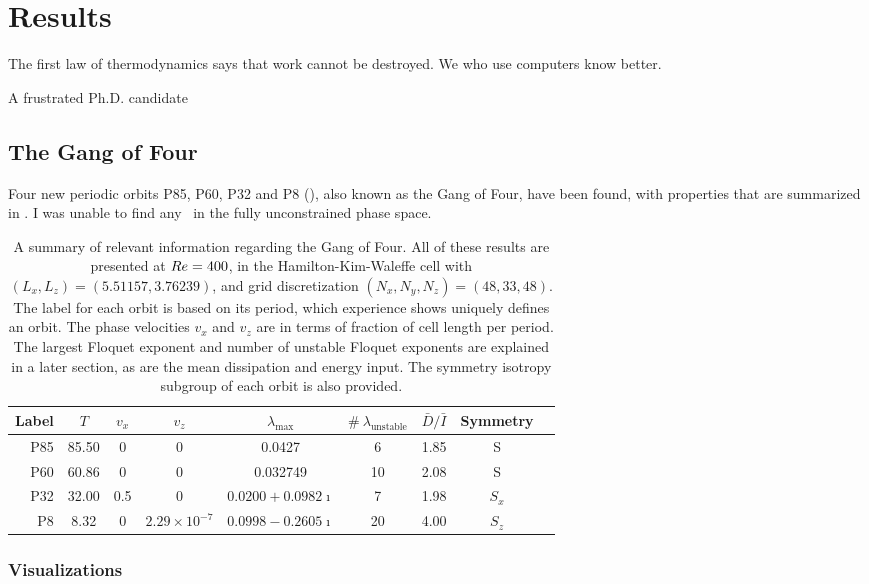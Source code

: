 \chapter{Results}
\epigraph{The first law of thermodynamics says that work cannot be destroyed. We who use computers know better.}{A frustrated Ph.D. candidate}

\section{The Gang of Four}

Four new periodic orbits P85, P60, P32 and P8 (), also known as the Gang of Four, have been found, with properties that are summarized in .  I was unable to find any \ecs\ in the fully unconstrained phase space. 

\begin{table}[h!]
\caption{A summary of relevant information regarding the Gang of Four. All of these results are presented at $Re = 400$, in the Hamilton-Kim-Waleffe cell with $(L_x,L_z) = (5.51157, 3.76239)$, and grid discretization $(N_x,N_y,N_z)= (48,33,48)$. The label for each orbit is based on its period, which experience shows uniquely defines an orbit. The phase velocities $v_x$ and $v_z$ are in terms of fraction of cell length per period. The largest Floquet exponent and number of unstable Floquet exponents are explained in a later section, as are the mean dissipation and energy input. The symmetry isotropy subgroup of each orbit is also provided. }   \label{tab:summary}
\begin{center}
\begin{tabular}{| r |  c | c | c | c | c | c | c | l |}
\toprule
Label & $T$ & $v_x$ & $v_z$ &  $\lambda_{\textrm{max}}$ & $\#\ \lambda_{\textrm{unstable}}$ & $\bar{D}/\bar{I}$&  Symmetry \\
\midrule
P85 & 85.50 & 0 & 0 & 0.0427 & 6 &1.85 & S\\
\midrule
P60 & 60.86 & 0 & 0 &  0.032749 & 10 & 2.08 & S\\
\midrule
P32 & 32.00 & 0.5 & 0 &  $0.0200 + 0.0982\imath$ & 7& 1.98 &$S_x$\\
\midrule
P8 & 8.32 & 0 & $2.29\times 10^{-7}$ & $0.0998 - 0.2605 \imath$ &20& 4.00& $S_z$\\
\bottomrule
\end{tabular}
\end{center}
\end{table}
\subsection{Visualizations}   

